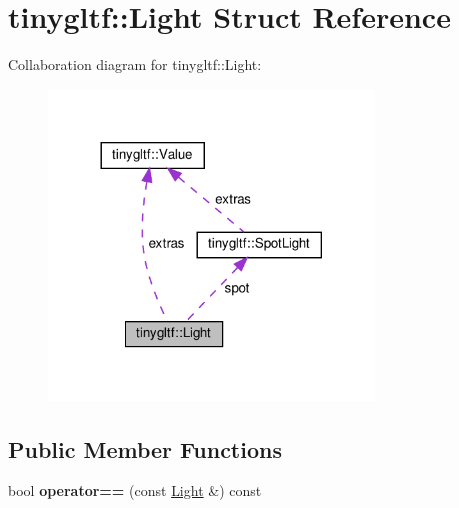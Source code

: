 \hypertarget{structtinygltf_1_1Light}{}\section{tinygltf\+:\+:Light Struct Reference}
\label{structtinygltf_1_1Light}


Collaboration diagram for tinygltf\+:\+:Light\+:\nopagebreak
\begin{figure}[H]
\begin{center}
\leavevmode
\includegraphics[width=245pt]{structtinygltf_1_1Light__coll__graph}
\end{center}
\end{figure}
\subsection*{Public Member Functions}
\begin{DoxyCompactItemize}
\item 
\mbox{\label{structtinygltf_1_1Light_aa130a1be43d07bcbd124633ac76cb05b}} 
bool {\bfseries operator==} (const \hyperlink{structtinygltf_1_1Light}{Light} \&) const
\end{DoxyCompactItemize}
